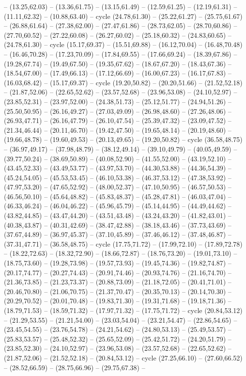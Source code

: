 {-- (13.25,62.03) -- (13.36,61.75) -- (13.15,61.49) -- (12.59,61.25) -- (12.19,61.31) -- (11.11,62.32) -- (10.88,63.40) -- cycle (24.78,61.30) -- (25.22,61.27) -- (25.75,61.67) -- (26.88,61.64) -- (27.38,62.00) -- (27.47,61.86) -- (28.73,62.05) -- (28.70,60.86) -- (27.70,60.52) -- (27.22,60.08) -- (26.27,60.02) -- (25.18,60.32) -- (24.83,60.65) -- (24.78,61.30) -- cycle (15.17,69.37) -- (15.51,69.88) -- (16.12,70.04) -- (16.48,70.48) -- (16.46,70.28) -- (17.23,70.09) -- (17.84,69.55) -- (17.66,69.24) -- (18.39,67.86) -- (19.28,67.74) -- (19.49,67.50) -- (19.35,67.62) -- (18.67,67.20) -- (18.43,67.36) -- (18.54,67.00) -- (17.49,66.13) -- (17.12,66.69) -- (16.00,67.23) -- (16.17,67.83) -- (16.03,68.42) -- (15.17,69.37) -- cycle (19.20,50.82) -- (20.20,51.66) -- (21.52,52.18) -- (21.87,52.06) -- (22.65,52.62) -- (23.57,52.68) -- (23.96,53.08) -- (24.10,52.97) -- (23.85,52.31) -- (23.97,52.00) -- (24.38,51.73) -- (25.12,51.77) -- (24.94,51.26) -- (25.50,50.95) -- (26.16,49.27) -- (27.03,49.09) -- (26.98,48.60) -- (27.26,48.06) -- (26.93,47.71) -- (26.16,47.79) -- (26.10,47.54) -- (25.39,47.32) -- (23.09,47.52) -- (21.34,46.44) -- (20.11,46.70) -- (19.42,47.50) -- (19.65,48.14) -- (20.19,48.60) -- (19.66,48.78) -- (19.60,49.53) -- (20.13,49.65) -- (19.20,50.82) -- cycle (36.58,48.75) -- (36.97,49.17) -- (37.98,48.79) -- (38.12,49.14) -- (39.10,49.79) -- (40.05,49.59) -- (39.77,50.24) -- (38.69,50.89) -- (40.08,52.90) -- (41.55,52.00) -- (43.19,52.10) -- (43.45,52.33) -- (43.49,53.77) -- (43.97,53.70) -- (44.30,53.88) -- (44.36,54.39) -- (45.24,54.05) -- (45.53,53.45) -- (46.10,53.38) -- (46.37,53.12) -- (47.38,53.92) -- (47.97,53.20) -- (47.65,52.92) -- (48.00,52.37) -- (47.10,50.95) -- (46.57,50.53) -- (46.56,50.10) -- (45.64,48.82) -- (45.83,48.37) -- (45.28,47.81) -- (46.03,47.04) -- (46.33,46.24) -- (46.04,46.22) -- (45.96,45.79) -- (45.14,44.95) -- (44.49,44.62) -- (43.82,44.85) -- (43.47,44.20) -- (43.51,43.48) -- (43.24,43.20) -- (41.82,43.01) -- (40.38,43.87) -- (40.31,42.69) -- (38.47,42.88) -- (38.18,43.46) -- (37.73,43.69) -- (37.67,44.89) -- (36.97,45.37) -- (37.10,45.89) -- (37.46,46.12) -- (37.48,46.87) -- (37.31,47.71) -- (36.58,48.75) -- cycle (17.75,71.72) -- (17.99,72.10) -- (17.89,72.78) -- (18.22,72.63) -- (18.32,72.90) -- (18.66,72.87) -- (18.76,73.20) -- (19.01,73.10) -- (18.75,73.60) -- (19.28,73.98) -- (19.57,73.93) -- (19.45,74.36) -- (19.82,74.87) -- (20.17,74.77) -- (20.27,74.43) -- (20.91,74.46) -- (20.93,74.76) -- (21.16,74.70) -- (21.36,73.85) -- (21.23,73.37) -- (20.88,73.09) -- (21.18,72.05) -- (20.41,71.01) -- (20.46,70.80) -- (21.06,70.75) -- (21.37,70.47) -- (20.35,70.13) -- (20.14,70.30) -- (20.29,70.52) -- (20.01,70.48) -- (19.83,71.30) -- (19.31,71.68) -- (19.18,71.36) -- (18.79,71.53) -- (18.59,71.32) -- (17.97,71.32) -- (17.75,71.72) -- cycle (20.84,53.12) -- (21.29,53.55) -- (21.21,54.00) -- (23.03,54.04) -- (23.21,54.47) -- (22.86,54.65) -- (23.45,54.55) -- (23.76,54.78) -- (24.21,54.62) -- (24.80,53.13) -- (25.49,53.57) -- (25.83,53.57) -- (25.48,52.32) -- (25.65,52.09) -- (25.42,51.72) -- (24.20,51.79) -- (23.85,52.30) -- (24.10,52.97) -- (23.96,53.08) -- (23.57,52.68) -- (22.65,52.62) -- (21.87,52.06) -- (21.52,52.18) -- (20.84,53.12) -- cycle (27.25,66.10) -- (27.60,66.52) -- (28.52,66.59) -- (28.75,66.96) -- (29.75,67.38) -- }
